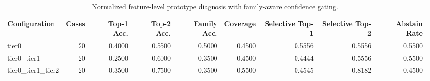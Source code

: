 \begin{table}[t]
\centering
\caption{Normalized feature-level prototype diagnosis with family-aware confidence gating.}
\label{tab:dice_stressor_hierarchical_diagnosis}
\footnotesize
\begin{tabular}{lrrrrrrrr}
\toprule
Configuration & Cases & Top-1 Acc. & Top-2 Acc. & Family Acc. & Coverage & Selective Top-1 & Selective Top-2 & Abstain Rate \\
\midrule
tier0 & 20 & 0.4000 & 0.5500 & 0.5000 & 0.4500 & 0.5556 & 0.5556 & 0.5500 \\
tier0_tier1 & 20 & 0.2500 & 0.6000 & 0.3500 & 0.4500 & 0.4444 & 0.5556 & 0.5500 \\
tier0_tier1_tier2 & 20 & 0.3500 & 0.7500 & 0.3500 & 0.5500 & 0.4545 & 0.8182 & 0.4500 \\
\bottomrule
\end{tabular}

\end{table}
